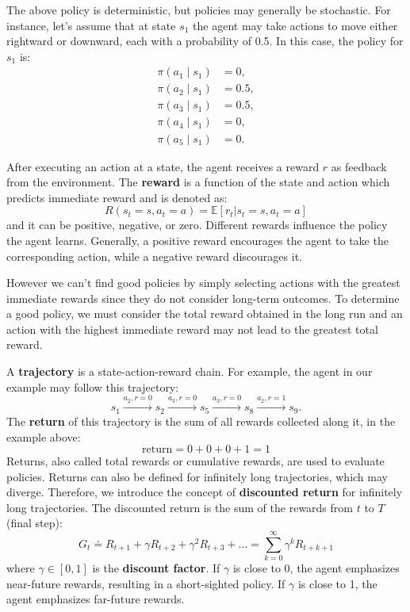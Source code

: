 The above policy is deterministic, but policies may generally be stochastic.
For instance, let's assume that at state \( s_1 \)
the agent may take actions to move either rightward or downward,
each with a probability of 0.5. In this case, the policy for \( s_1 \) is:
\[
\begin{aligned}
\pi(a_1 \mid s_1) &= 0, \\
\pi(a_2 \mid s_1) &= 0.5, \\
\pi(a_3 \mid s_1) &= 0.5, \\
\pi(a_4 \mid s_1) &= 0, \\
\pi(a_5 \mid s_1) &= 0.
\end{aligned}
\]

After executing an action at a state, the agent receives a
reward \( r \) as feedback from the environment.
The \textbf{reward} is a function of the state and action
which predicts immediate reward and is denoted as:
\begin{equation}
R(s_t=s, a_t=a) = \mathbb{E} [r_t | s_t = s, a_t = a]
\end{equation}
and it can be positive, negative, or zero.
Different rewards influence the policy the agent learns.
Generally, a positive reward encourages the agent to take the
corresponding action, while a negative reward discourages it.

However we can't find good policies
by simply selecting actions with the greatest immediate rewards
since they do not consider
long-term outcomes. To determine a good policy, we must consider the total
reward obtained in the long run and
an action with the highest immediate reward may not lead to
the greatest total reward.

A \textbf{trajectory} is a state-action-reward chain.
For example, the agent in our example may follow this trajectory:
\[ s_1 \xrightarrow{a_2, r=0} s_2 \xrightarrow{a_3, r=0} s_5 \xrightarrow{a_3, r=0} s_8 \xrightarrow{a_2, r=1} s_9. \]
The \textbf{return} of this trajectory is the sum of all rewards collected along it,
in the example above:
\[\text{return} = 0+0+0+1=1\]
Returns, also called total rewards or cumulative rewards,
are used to evaluate policies.
Returns can also be defined for infinitely long trajectories, which may diverge.
Therefore, we introduce the concept of \textbf{discounted return} for infinitely
long trajectories. The discounted return is the sum of the rewards from $t$ to $T$ (final step):
\begin{equation}
G_t \doteq R_{t+1} + \gamma R_{t+2} + \gamma^2 R_{t+3} + \ldots = \sum_{k=0}^{\infty} \gamma^k R_{t+k+1}
\end{equation}
where \( \gamma \in [0, 1] \) is the \textbf{discount factor}.
If \( \gamma \) is close to 0, the agent emphasizes near-future rewards,
resulting in a short-sighted policy. If \( \gamma \) is close to 1,
the agent emphasizes far-future rewards.

